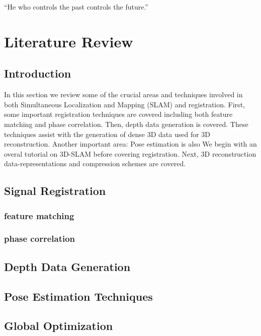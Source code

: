 \begin{savequote}[8cm]
  ``He who controls the past controls the future.''
\end{savequote}
\makeatletter
\chapter{Literature Review}

\section{Introduction}

In this section we review some of the crucial areas and techniques involved in both Simultaneous Localization and Mapping (SLAM) and registration. First, some important registration techniques are covered including both feature matching and phase correlation. Then, depth data generation is covered. These techniques assist with the generation of dense 3D data used for 3D reconstruction. Another important area: Pose estimation is also We begin with an overal tutorial on 3D-SLAM before covering registration. Next, 3D reconstruction data-representations and compression schemes are covered. 


\section{Signal Registration}
\subsection{feature matching}

\subsection{phase correlation}


\section{Depth Data Generation}

\section{Pose Estimation Techniques}

\section{Global Optimization}



